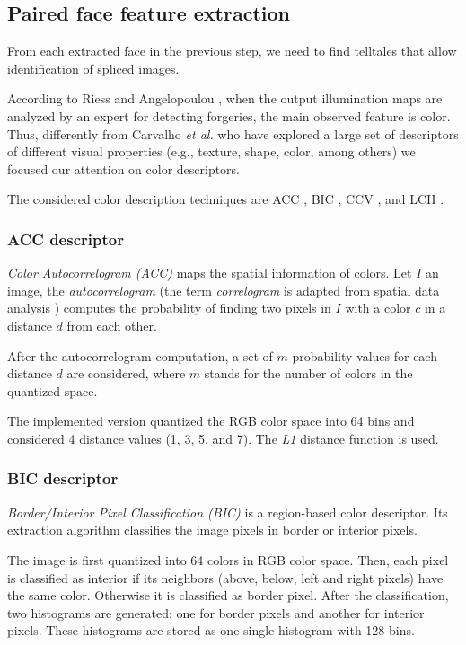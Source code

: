 \subsection{Paired face feature extraction}

From each extracted face in the previous step, we need to find telltales that allow identification of spliced images. 

According to Riess and Angelopoulou \cite{riess2010scene}, when the output illumination maps are analyzed by an expert for detecting forgeries, the main observed feature is color. Thus, differently from Carvalho \emph{et al.} \cite{carvalho2016illuminant} who have explored a large set of descriptors of different visual properties (e.g., texture, shape, color, among others) we focused our attention on color descriptors.

The considered color description techniques are ACC \cite{huang1997image}, BIC \cite{stehling2002compact}, CCV \cite{pass1997comparing}, and LCH \cite{swain1991color}.

\subsubsection{ACC descriptor}

\emph{Color Autocorrelogram (ACC) }\cite{huang1997image} maps the spatial information of colors. Let $I$ an image, the \emph{autocorrelogram} (the term \emph{correlogram} is adapted from spatial data analysis \cite{upton1985spatial}) computes the probability of finding two pixels in $I$ with a color $c$ in a distance $d$ from each other. 

After the autocorrelogram computation, a set of $m$ probability values for each distance $d$ are considered, where $m$ stands for the number of colors in the quantized space. 

The implemented version quantized the RGB color space into 64 bins and considered 4 distance values (1, 3, 5, and 7). The \emph{L1} distance function is used.

\subsubsection{BIC descriptor}

\emph{Border/Interior Pixel Classification (BIC)} \cite{stehling2002compact} is a region-based color descriptor. Its extraction algorithm classifies the image pixels in border or interior
pixels. 

The image is first quantized into 64 colors in RGB color space. Then, each pixel is classified as interior
if its neighbors (above, below, left and right pixels) have the same color. Otherwise it is classified as border pixel. After the classification, two histograms are generated: one for border pixels and another for interior pixels. These histograms are stored as one single histogram with 128 bins.

